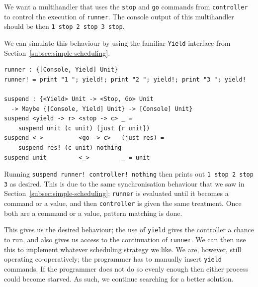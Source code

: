\documentclass[msc,deptreport,cs]{infthesis} %
\newcommand{\code}[1]{\lstinline{#1}}
\begin{document}

\noindent We want a multihandler that uses the \code{stop} and \code{go} commands from
\code{controller} to control the execution of \code{runner}. The console output
of this multihandler should be then \code{1 stop 2 stop 3 stop}.
%



We can simulate this behaviour by using the familiar \code{Yield} interface from
Section~\ref{subsec:simple-scheduling}.

\begin{lstlisting}
runner : {[Console, Yield] Unit}
runner! = print "1 "; yield!; print "2 "; yield!; print "3 "; yield!

suspend : {<Yield> Unit -> <Stop, Go> Unit
  -> Maybe {[Console, Yield] Unit} -> [Console] Unit}
suspend <yield -> r> <stop -> c> _ =
    suspend unit (c unit) (just {r unit})
suspend <_>          <go -> c>   (just res) =
    suspend res! (c unit) nothing
suspend unit         <_>         _ = unit
\end{lstlisting}

\noindent Running \code{suspend runner! controller! nothing} then prints out
\code{1 stop 2 stop 3} as desired.
%
This is due to the same synchronisation behaviour that we saw in
Section~\ref{subsec:simple-scheduling}; \code{runner} is evaluated until it
becomes a command or a value, and then \code{controller} is given the same
treatment. Once both are a command or a value, pattern matching is done.

This gives us the desired behaviour; the use of \code{yield} gives the
controller a chance to run, and also gives us access to the continuation of
\code{runner}. We can then use this to implement whatever scheduling strategy we
like.
%
We are, however, still operating co-operatively; the programmer has to manually
insert \code{yield} commands. If the programmer does not do so evenly enough
then either process could become starved. As such, we continue searching for a
better solution.
\end{document}
